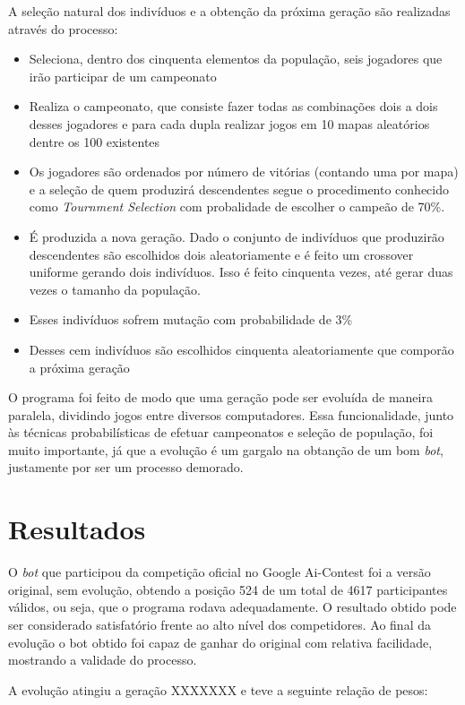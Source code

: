 \documentclass[a4paper,titlepage,11pt]{article}
\begin{document}
A seleção natural dos indivíduos e a obtenção da próxima geração são realizadas através do processo:
\begin{itemize}
	\item Seleciona, dentro dos cinquenta elementos da população, seis jogadores que irão participar de um campeonato
	\item Realiza o campeonato, que consiste fazer todas as combinações dois a dois desses jogadores e para cada dupla realizar jogos em 10 mapas aleatórios dentre os 100 existentes 
	\item Os jogadores são ordenados por número de vitórias (contando uma por mapa) e a seleção de quem produzirá descendentes segue o procedimento conhecido como {\em Tournment Selection} com probalidade de escolher o campeão de 70\%.
	\item É produzida a nova geração. Dado o conjunto de indivíduos que produzirão descendentes são escolhidos dois aleatoriamente e é feito um crossover uniforme gerando dois indivíduos. Isso é feito cinquenta vezes, até gerar duas vezes o tamanho da população. 
	\item Esses indivíduos sofrem mutação com probabilidade de 3\%
	\item Desses cem indivíduos são escolhidos cinquenta aleatoriamente que comporão a próxima geração
\end{itemize}

O programa foi feito de modo que uma geração pode ser evoluída de maneira paralela, dividindo jogos entre diversos computadores. Essa funcionalidade, junto às técnicas probabilísticas de efetuar campeonatos e seleção de população, foi muito importante, já que a evolução é um gargalo na obtanção de um bom {\em bot}, justamente por ser um processo demorado.

\section{Resultados}
O {\em bot} que participou da competição oficial no Google Ai-Contest foi a versão original, sem evolução, obtendo a posição 524 de um total de 4617 participantes válidos, ou seja, que o programa rodava adequadamente. O resultado obtido pode ser considerado satisfatório frente ao alto nível dos competidores. Ao final da evolução o bot obtido foi capaz de ganhar do original com relativa facilidade, mostrando a validade do processo.

A evolução atingiu a geração XXXXXXX e teve a seguinte relação de pesos:
\end{document}

